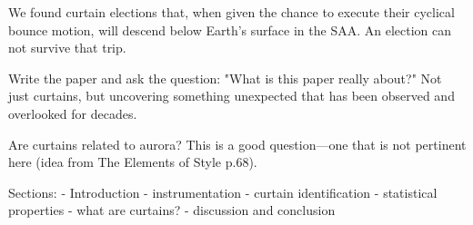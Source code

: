 \documentclass[draft]{agujournal2019}
\begin{document}
We found curtain elections that, when given the chance to execute their cyclical bounce motion, will descend below Earth's surface in the SAA. An election can not survive that trip.

Write the paper and ask the question: "What is this paper really about?" Not just curtains, but uncovering something unexpected that has been observed and overlooked for decades.

Are curtains related to aurora? This is a good question---one that is not pertinent here (idea from The Elements of Style p.68).

Sections:
- Introduction
- instrumentation
- curtain identification
- statistical properties
- what are curtains?
- discussion and conclusion



\end{document}
